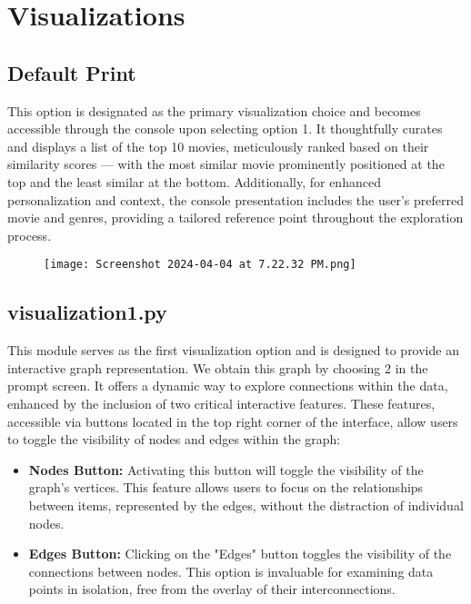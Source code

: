 \documentclass[fontsize=11pt]{article}
\begin{document}
\section*{Visualizations}

\subsection*{Default Print}
This option is designated as the primary visualization choice and becomes accessible through the console upon selecting option 1. It thoughtfully curates and displays a list of the top 10 movies, meticulously ranked based on their similarity scores — with the most similar movie prominently positioned at the top and the least similar at the bottom. Additionally, for enhanced personalization and context, the console presentation includes the user's preferred movie and genres, providing a tailored reference point throughout the exploration process.

\begin{figure}[H] %
    \centering
    \texttt{[image: Screenshot 2024-04-04 at 7.22.32 PM.png]} %
    \label{fig:dir-structure} %
\end{figure}

\subsection*{visualization1.py}
This module serves as the first visualization option and is designed to provide an interactive graph representation. We obtain this graph by choosing 2 in the prompt screen. It offers a dynamic way to explore connections within the data, enhanced by the inclusion of two critical interactive features. These features, accessible via buttons located in the top right corner of the interface, allow users to toggle the visibility of nodes and edges within the graph:

\begin{itemize}
    \item \textbf{Nodes Button:} Activating this button will toggle the visibility of the graph's vertices. This feature allows users to focus on the relationships between items, represented by the edges, without the distraction of individual nodes.
    \item \textbf{Edges Button:} Clicking on the "Edges" button toggles the visibility of the connections between nodes. This option is invaluable for examining data points in isolation, free from the overlay of their interconnections.
\end{itemize}
\end{document}
